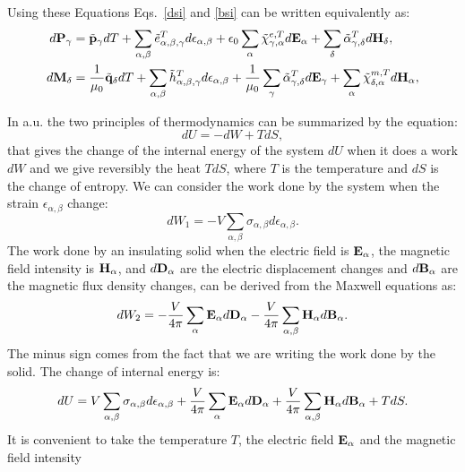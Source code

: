 \documentclass[12pt,a4paper]{article}
\begin{document}
Using these Equations Eqs.~\ref{dsi} and \ref{bsi} can be written
equivalently as:
\begin{align}
d{\bf P}_\gamma&=
\tilde {\bf p}_\gamma dT + \sum_{\alpha,\beta} \tilde 
e^T_{\alpha,\beta,\gamma} d\epsilon_{\alpha,\beta}
+\epsilon_0 \sum_\alpha \tilde \chi^{e,T}_{\gamma,\alpha} 
d{\bf E}_{\alpha} + 
\sum_\delta \tilde \alpha^T_{\gamma,\delta} d{\bf H}_{\delta}, \\
d{\bf M}_\delta&=
{1\over \mu_0}\tilde {\bf q}_\delta dT+ \sum_{\alpha,\beta}
\tilde h^T_{\alpha,\beta,\gamma}
d\epsilon_{\alpha,\beta}
+{1\over \mu_0}\sum_\gamma \tilde \alpha^T_{\gamma,\delta}
d{\bf E}_{\gamma}+ 
\sum_\alpha \tilde \chi^{m,T}_{\delta,\alpha}
d{\bf H}_{\alpha}, 
\end{align}

\newpage
{\color{web-blue}
In a.u. the two principles of thermodynamics can be summarized by the equation:
\begin{equation}
dU = -dW + T dS,
\end{equation}
that gives the change of the internal energy of the system $dU$ when
it does a work $dW$ and we give reversibly the heat $T dS$, where $T$ 
is the temperature and $dS$ is the change of entropy.
We can consider the work done by the system when the strain
$\epsilon_{\alpha,\beta}$ change:
\begin{equation}
dW_1 =-V \sum_{\alpha,\beta} \sigma_{\alpha,\beta} d \epsilon_{\alpha,\beta}. 
\end{equation}
The work done by an insulating solid when the electric field is 
${\bf E}_\alpha$, the magnetic field intensity is ${\bf H}_\alpha$, 
and $d {\bf D}_\alpha$ are the electric displacement changes and 
$d {\bf B}_\alpha$ are the magnetic flux density changes, can be derived
from the Maxwell equations as: 
\begin{equation}
dW_2 = -{V \over 4 \pi} \sum_\alpha {\bf E}_\alpha d {\bf D}_\alpha 
-{V \over 4 \pi} \sum_{\alpha,\beta} {\bf H}_{\alpha} d {\bf B}_\alpha.
\end{equation}
The minus sign comes from the fact that we are writing the work done by the
solid. The change of internal energy is:
\begin{equation}
dU = V \sum_{\alpha,\beta} \sigma_{\alpha,\beta} d \epsilon_{\alpha,\beta}
+ {V\over 4 \pi} \sum_\alpha {\bf E}_\alpha d {\bf D}_\alpha + 
{V \over 4 \pi} \sum_{\alpha,\beta} {\bf H}_{\alpha} d {\bf B}_\alpha + T dS.
\end{equation}
It is convenient to take the temperature $T$,
the electric field ${\bf E}_\alpha$ and the magnetic field intensity
}
\end{document}
